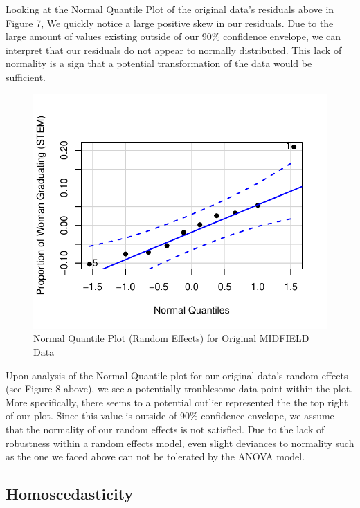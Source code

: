 \documentclass[]{article}
\begin{document}
Looking at the Normal Quantile Plot of the original data's residuals
above in Figure 7, We quickly notice a large positive skew in our
residuals. Due to the large amount of values existing outside of our
90\% confidence envelope, we can interpret that our residuals do not
appear to normally distributed. This lack of normality is a sign that a
potential transformation of the data would be sufficient.

\begin{figure}
\centering
\includegraphics{Stat_461_Final_Project_Report_files/figure-latex/normalityRE-1.pdf}
\caption{Normal Quantile Plot (Random Effects) for Original MIDFIELD
Data}
\end{figure}

Upon analysis of the Normal Quantile plot for our original data's random
effects (see Figure 8 above), we see a potentially troublesome data
point within the plot. More specifically, there seems to a potential
outlier represented the the top right of our plot. Since this value is
outside of 90\% confidence envelope, we assume that the normality of our
random effects is not satisfied. Due to the lack of robustness within a
random effects model, even slight deviances to normality such as the one
we faced above can not be tolerated by the ANOVA model.

\subsection{Homoscedasticity}\label{homoscedasticity}
\end{document}
